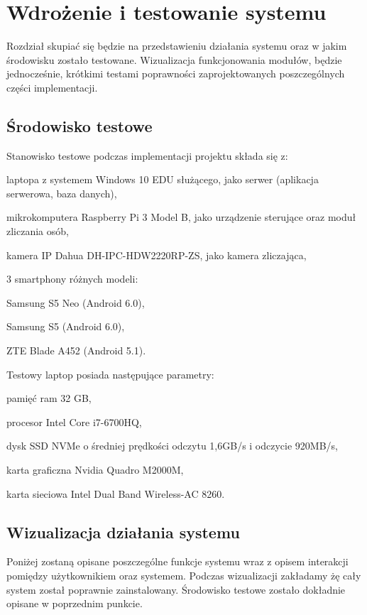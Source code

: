 \newpage
\section{Wdrożenie i testowanie systemu \NazwaSys} \label{sec:testy}
Rozdział skupiać się będzie na przedstawieniu działania systemu oraz w jakim środowisku zostało testowane. Wizualizacja funkcjonowania modułów, będzie jednocześnie, krótkimi testami poprawności zaprojektowanych poszczególnych części implementacji. 

\subsection{Środowisko testowe}
Stanowisko testowe podczas implementacji projektu składa się z:
\begin{itemize*}
	\item laptopa z systemem Windows 10 EDU służącego, jako serwer (aplikacja serwerowa, baza danych),
	\item mikrokomputera Raspberry Pi 3 Model B, jako urządzenie sterujące oraz moduł zliczania osób,
	\item kamera IP Dahua DH-IPC-HDW2220RP-ZS, jako kamera zliczająca,
	\item 3 smartphony różnych modeli:
	\begin{enumerate*}
		\item Samsung S5 Neo (Android 6.0),
		\item Samsung S5 (Android 6.0),
		\item ZTE Blade A452 (Android 5.1).
	\end{enumerate*}
\end{itemize*}

Testowy laptop posiada następujące parametry:
\begin{itemize*}
	\item pamięć ram 32 GB,
	\item procesor Intel Core i7-6700HQ,
	\item dysk SSD NVMe o średniej prędkości odczytu 1,6GB/s i odczycie 920MB/s,
	\item karta graficzna Nvidia Quadro M2000M,
	\item karta sieciowa Intel Dual Band Wireless-AC 8260.
\end{itemize*}

\subsection{Wizualizacja działania systemu \textsl{\NazwaSys}}
Poniżej zostaną opisane poszczególne funkcje systemu wraz z opisem interakcji pomiędzy użytkownikiem oraz systemem. Podczas wizualizacji zakładamy żę cały system został poprawnie zainstalowany. Środowisko testowe zostało dokładnie opisane w poprzednim punkcie.

